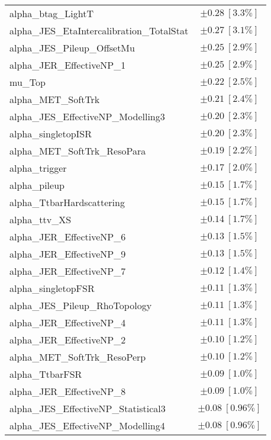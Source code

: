 \begin{table}
\begin{center}
\begin{tabular*}{\textwidth}{@{\extracolsep{\fill}}lc}
alpha\_btag\_LightT         & $\pm 0.28\ [3.3\%] $       \\
alpha\_JES\_EtaIntercalibration\_TotalStat         & $\pm 0.27\ [3.1\%] $       \\
alpha\_JES\_Pileup\_OffsetMu         & $\pm 0.25\ [2.9\%] $       \\
alpha\_JER\_EffectiveNP\_1         & $\pm 0.25\ [2.9\%] $       \\
mu\_Top         & $\pm 0.22\ [2.5\%] $       \\
alpha\_MET\_SoftTrk         & $\pm 0.21\ [2.4\%] $       \\
alpha\_JES\_EffectiveNP\_Modelling3         & $\pm 0.20\ [2.3\%] $       \\
alpha\_singletopISR         & $\pm 0.20\ [2.3\%] $       \\
alpha\_MET\_SoftTrk\_ResoPara         & $\pm 0.19\ [2.2\%] $       \\
alpha\_trigger         & $\pm 0.17\ [2.0\%] $       \\
alpha\_pileup         & $\pm 0.15\ [1.7\%] $       \\
alpha\_TtbarHardscattering         & $\pm 0.15\ [1.7\%] $       \\
alpha\_ttv\_XS         & $\pm 0.14\ [1.7\%] $       \\
alpha\_JER\_EffectiveNP\_6         & $\pm 0.13\ [1.5\%] $       \\
alpha\_JER\_EffectiveNP\_9         & $\pm 0.13\ [1.5\%] $       \\
alpha\_JER\_EffectiveNP\_7         & $\pm 0.12\ [1.4\%] $       \\
alpha\_singletopFSR         & $\pm 0.11\ [1.3\%] $       \\
alpha\_JES\_Pileup\_RhoTopology         & $\pm 0.11\ [1.3\%] $       \\
alpha\_JER\_EffectiveNP\_4         & $\pm 0.11\ [1.3\%] $       \\
alpha\_JER\_EffectiveNP\_2         & $\pm 0.10\ [1.2\%] $       \\
alpha\_MET\_SoftTrk\_ResoPerp         & $\pm 0.10\ [1.2\%] $       \\
alpha\_TtbarFSR         & $\pm 0.09\ [1.0\%] $       \\
alpha\_JER\_EffectiveNP\_8         & $\pm 0.09\ [1.0\%] $       \\
alpha\_JES\_EffectiveNP\_Statistical3         & $\pm 0.08\ [0.96\%] $       \\
alpha\_JES\_EffectiveNP\_Modelling4         & $\pm 0.08\ [0.96\%] $       \\

\end{tabular*}
\end{center}
\end{table}
